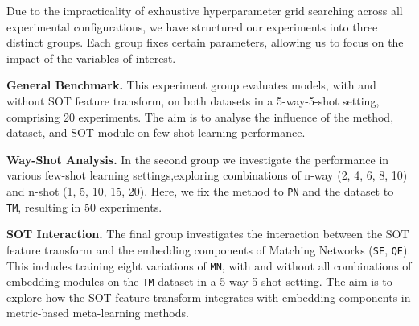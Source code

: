 Due to the impracticality of exhaustive hyperparameter grid searching across all experimental configurations, we have structured our experiments into three distinct groups. Each group fixes certain parameters, allowing us to focus on the impact of the variables of interest.

\textbf{General Benchmark.} This experiment group evaluates models, with and without SOT feature transform, on both datasets in a 5-way-5-shot setting, comprising 20 experiments. The aim is to analyse the influence of the method, dataset, and SOT module on few-shot learning performance.


\textbf{Way-Shot Analysis.} In the second group we investigate the performance in various few-shot learning settings,exploring combinations of n-way ({2, 4, 6, 8, 10}) and n-shot ({1, 5, 10, 15, 20}). Here, we fix the method to \texttt{PN} and the dataset to \texttt{TM}, resulting in 50 experiments.


\textbf{SOT Interaction.} The final group investigates the interaction between the SOT feature transform and the embedding components of Matching Networks (\texttt{SE}, \texttt{QE}). This includes training eight variations of \texttt{MN}, with and without all combinations of embedding modules on the \texttt{TM} dataset in a 5-way-5-shot setting. The aim is to explore how the SOT feature transform integrates with embedding components in metric-based meta-learning methods.

